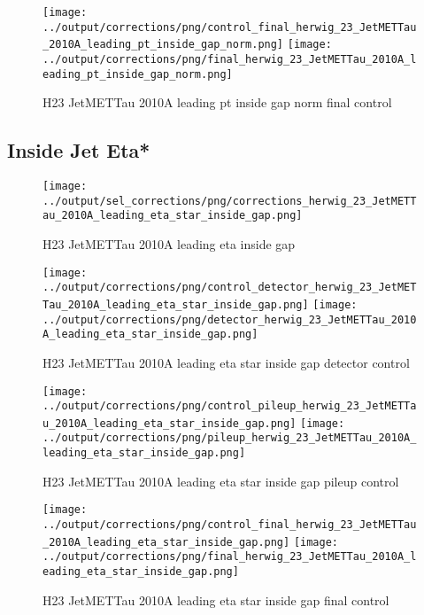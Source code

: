\documentclass[11pt]{book}
\begin{document}
\begin{figure}[ht]
\centering
\texttt{[image: ../output/corrections/png/control\_final\_herwig\_23\_JetMETTau\_2010A\_leading\_pt\_inside\_gap\_norm.png]}
\texttt{[image: ../output/corrections/png/final\_herwig\_23\_JetMETTau\_2010A\_leading\_pt\_inside\_gap\_norm.png]}
\caption{H23 JetMETTau 2010A leading pt inside gap norm final control}
\label{fig:H23_JetMETTau_2010A_leading_pt_inside_gap_norm_final_control}
\end{figure}


\clearpage
\subsection{Inside Jet Eta*}
\begin{figure}[ht]
\centering
\texttt{[image: ../output/sel\_corrections/png/corrections\_herwig\_23\_JetMETTau\_2010A\_leading\_eta\_star\_inside\_gap.png]}
\caption{H23 JetMETTau 2010A leading eta inside gap}
\label{fig:H23_JetMETTau_2010A_leading_eta_star_inside_gap}
\end{figure}

\begin{figure}[ht]
\centering
\texttt{[image: ../output/corrections/png/control\_detector\_herwig\_23\_JetMETTau\_2010A\_leading\_eta\_star\_inside\_gap.png]}
\texttt{[image: ../output/corrections/png/detector\_herwig\_23\_JetMETTau\_2010A\_leading\_eta\_star\_inside\_gap.png]}
\caption{H23 JetMETTau 2010A leading eta star inside gap detector control}
\label{fig:H23_JetMETTau_2010A_leading_eta_star_inside_gap_detector_control}
\end{figure}

\begin{figure}[ht]
\centering
\texttt{[image: ../output/corrections/png/control\_pileup\_herwig\_23\_JetMETTau\_2010A\_leading\_eta\_star\_inside\_gap.png]}
\texttt{[image: ../output/corrections/png/pileup\_herwig\_23\_JetMETTau\_2010A\_leading\_eta\_star\_inside\_gap.png]}
\caption{H23 JetMETTau 2010A leading eta star inside gap pileup control}
\label{fig:H23_JetMETTau_2010A_leading_eta_star_inside_gap_pileup_control}
\end{figure}


\begin{figure}[ht]
\centering
\texttt{[image: ../output/corrections/png/control\_final\_herwig\_23\_JetMETTau\_2010A\_leading\_eta\_star\_inside\_gap.png]}
\texttt{[image: ../output/corrections/png/final\_herwig\_23\_JetMETTau\_2010A\_leading\_eta\_star\_inside\_gap.png]}
\caption{H23 JetMETTau 2010A leading eta star inside gap final control}
\label{fig:H23_JetMETTau_2010A_leading_eta_star_inside_gap_final_control}
\end{figure}
\end{document}
